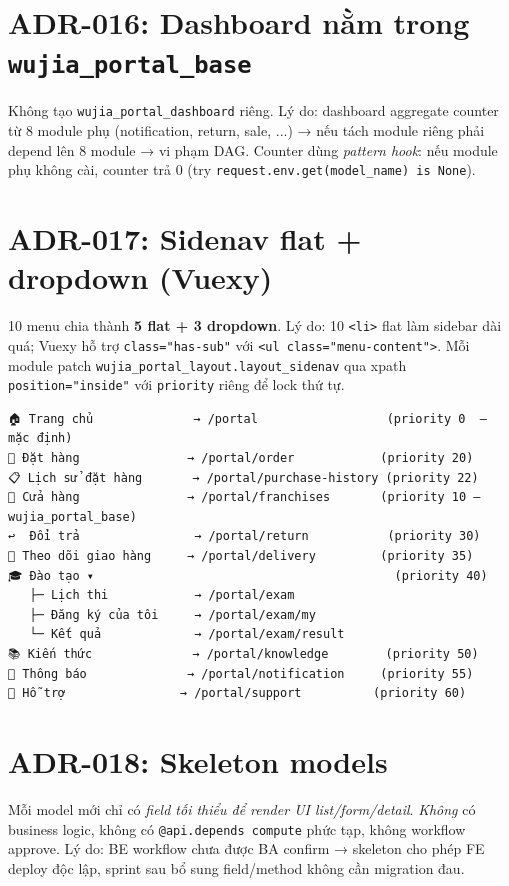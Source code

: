 \section{ADR-016: Dashboard nằm trong \texttt{wujia\_portal\_base}}

Không tạo \texttt{wujia\_portal\_dashboard} riêng. Lý do: dashboard aggregate counter từ 8 module phụ (notification, return, sale, ...) → nếu tách module riêng phải depend lên 8 module → vi phạm DAG. Counter dùng \emph{pattern hook}: nếu module phụ không cài, counter trả 0 (try \texttt{request.env.get(model\_name) is None}).

\section{ADR-017: Sidenav flat + dropdown (Vuexy)}

10 menu chia thành \textbf{5 flat + 3 dropdown}. Lý do: 10 \texttt{<li>} flat làm sidebar dài quá; Vuexy hỗ trợ \texttt{class="has-sub"} với \texttt{<ul class="menu-content">}. Mỗi module patch \texttt{wujia\_portal\_layout.layout\_sidenav} qua xpath \texttt{position="inside"} với \texttt{priority} riêng để lock thứ tự.

\begin{lstlisting}[style=shell]
🏠 Trang chủ              → /portal                  (priority 0  — mặc định)
🛒 Đặt hàng               → /portal/order            (priority 20)
📋 Lịch sử đặt hàng       → /portal/purchase-history (priority 22)
🏢 Cửa hàng               → /portal/franchises       (priority 10 — wujia_portal_base)
↩  Đổi trả                → /portal/return           (priority 30)
🚚 Theo dõi giao hàng     → /portal/delivery         (priority 35)
🎓 Đào tạo ▾                                          (priority 40)
   ├─ Lịch thi            → /portal/exam
   ├─ Đăng ký của tôi     → /portal/exam/my
   └─ Kết quả             → /portal/exam/result
📚 Kiến thức              → /portal/knowledge        (priority 50)
🔔 Thông báo              → /portal/notification     (priority 55)
🛟 Hỗ trợ                → /portal/support          (priority 60)
\end{lstlisting}

\section{ADR-018: Skeleton models}

Mỗi model mới chỉ có \emph{field tối thiểu để render UI list/form/detail}. \emph{Không} có business logic, không có \texttt{@api.depends compute} phức tạp, không workflow approve. Lý do: BE workflow chưa được BA confirm → skeleton cho phép FE deploy độc lập, sprint sau bổ sung field/method không cần migration đau.


